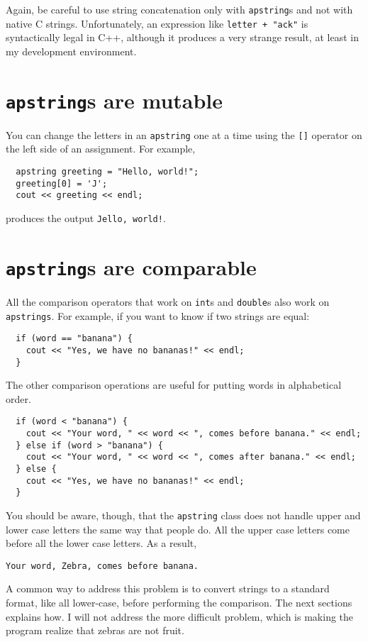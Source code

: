 Again, be careful to use string concatenation only with {\tt apstring}s
and not with native C strings.  Unfortunately, an expression like
{\tt letter + "ack"} is syntactically legal in C++, although it
produces a very strange result, at least in my development environment.

\section{{\tt apstring}s are mutable}

You can change the letters in an {\tt apstring} one at a time
using the {\tt []} operator on the left side of an assignment.
For example,

\begin{verbatim}
  apstring greeting = "Hello, world!";
  greeting[0] = 'J';
  cout << greeting << endl;
\end{verbatim}
%
produces the output {\tt Jello, world!}.


\section{{\tt apstring}s are comparable}
\label{incomparable}

All the comparison operators that work on {\tt int}s and
{\tt double}s also work on {\tt apstrings}.  For example,
if you want to know if two strings are equal:

\begin{verbatim}
  if (word == "banana") {
    cout << "Yes, we have no bananas!" << endl;
  }
\end{verbatim}
%
The other comparison operations are useful for putting words
in alphabetical order.

\begin{verbatim}
  if (word < "banana") {
    cout << "Your word, " << word << ", comes before banana." << endl;
  } else if (word > "banana") {
    cout << "Your word, " << word << ", comes after banana." << endl;
  } else {
    cout << "Yes, we have no bananas!" << endl;
  }
\end{verbatim}
%
You should be aware, though, that the {\tt apstring} class does
not handle upper and lower case letters the same way that people
do.  All the upper case letters come before all the lower case
letters.  As a result,

\begin{verbatim}
Your word, Zebra, comes before banana.
\end{verbatim}
%
A common way to address this problem is to convert strings to a
standard format, like all lower-case, before performing the
comparison.  The next sections explains how.  I will not address the
more difficult problem, which is making the program realize that
zebras are not fruit.

